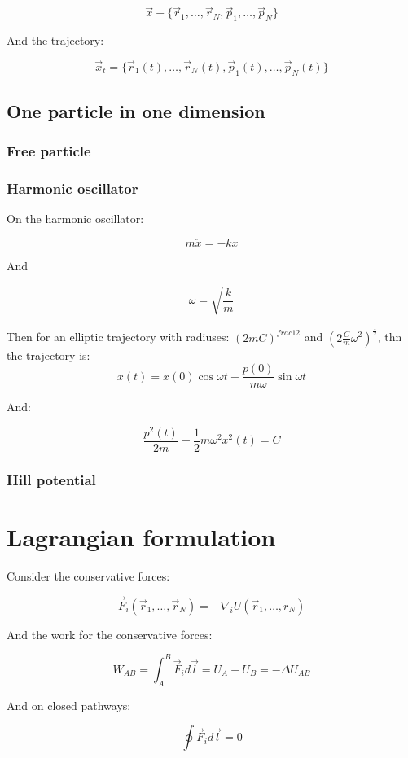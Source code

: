 	$$\vec{x} + \{\vec{r}_1, \dots, \vec{r}_N, \vec{p}_1, \dots, \vec{p}_N\}$$

	And the trajectory:

	$$\vec{x}_t = \{\vec{r}_1(t), \dots, \vec{r}_N(t), \vec{p}_1(t), \dots, \vec{p}_N(t)\}$$

	\subsection{One particle in one dimension}

		\subsubsection{Free particle}

		\subsubsection{Harmonic oscillator}
		On the harmonic oscillator:

		$$m\ddot{x} = -kx$$

		And

		$$\omega = \sqrt{\frac{k}{m}}$$

		Then for an elliptic trajectory with radiuses: $(2mC)^{frac{1}{2}}$ and $(2\frac{C}{m}\omega^2)^{\frac{1}{2}}$, thn the trajectory is:
		$$x(t) = x(0)\cos\omega t+ \frac{p(0)}{m\omega}\sin\omega t$$

		And:

		$$\frac{p^2(t)}{2m} +\frac{1}{2}m\omega^2x^2(t) = C$$

		\subsubsection{Hill potential}

\section{Lagrangian formulation}

Consider the conservative forces:

$$\vec{F}_i(\vec{r}_1, \dots, \vec{r}_N) = -\nabla_i U(\vec{r}_1, \dots, r_N)$$

And the work for the conservative forces:

$$W_{AB} = \int_A^B\vec{F}_id\vec{l} = U_A-U_B = -\Delta U_{AB}$$

And on closed pathways:

$$\oint\vec{F}_id\vec{l} = 0$$

